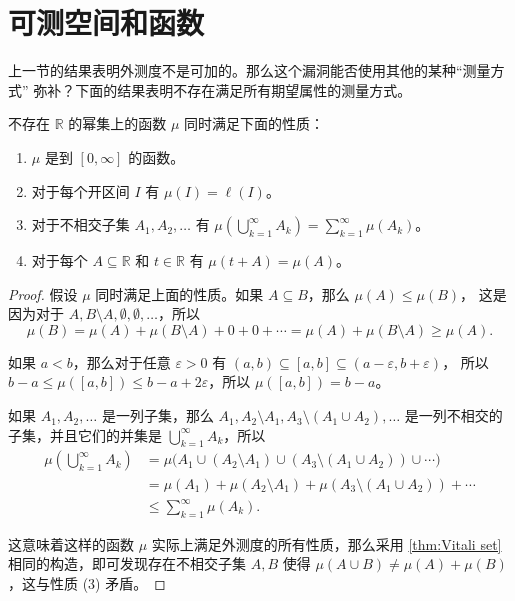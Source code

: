 \documentclass[fontset=none]{Notes}
\begin{document}
\section{可测空间和函数}

上一节的结果表明外测度不是可加的。那么这个漏洞能否使用其他的某种“测量方式”
弥补？下面的结果表明不存在满足所有期望属性的测量方式。

\begin{theorem}\label{thm:noexistence of size}
  不存在 $\mathbb{R}$ 的幂集上的函数 $\mu$ 同时满足下面的性质：
  \begin{enumerate}
    \item $\mu$ 是到 $[0,\infty]$ 的函数。
    \item 对于每个开区间 $I$ 有 $\mu(I)=\ell(I)$。
    \item 对于不相交子集 $A_1,A_2,\dots$ 有 $\mu\left(\bigcup_{k=1}^\infty A_k\right)=\sum_{k=1}^\infty\mu(A_k)$。
    \item 对于每个 $A\subseteq \mathbb{R}$ 和 $t\in \mathbb{R}$ 有 $\mu(t+A)=\mu(A)$。
  \end{enumerate}
\end{theorem}
\begin{proof}
  假设 $\mu$ 同时满足上面的性质。如果 $A\subseteq B$，那么 $\mu(A)\leq\mu(B)$，
  这是因为对于 $A,B\setminus A,\emptyset,\emptyset,\dots$，所以 
  \[
    \mu(B)=\mu(A)+\mu(B\setminus A)+0+0+\cdots=\mu(A)+\mu(B\setminus A)\geq \mu(A).
  \]

  如果 $a<b$，那么对于任意 $\varepsilon>0$ 有 $(a,b)\subseteq [a,b]\subseteq (a-\varepsilon,b+\varepsilon)$，
  所以 $b-a\leq \mu([a,b])\leq b-a+2\varepsilon$，所以 $\mu([a,b])=b-a$。

  如果 $A_1,A_2,\dots$ 是一列子集，那么 $A_1,A_2\setminus A_1,A_3\setminus (A_1\cup A_2),\dots$
  是一列不相交的子集，并且它们的并集是 $\bigcup_{k=1}^\infty A_k$，所以
  \begin{align*}
    \mu\left(\bigcup_{k=1}^\infty A_k\right)&=\mu\bigl(A_1\cup(A_2\setminus A_1)\cup(A_3\setminus(A_1\cup A_2))\cup\cdots\bigr)\\
    &=\mu(A_1)+\mu(A_2\setminus A_1)+\mu(A_3\setminus (A_1\cup A_2))+\cdots \\
    &\leq\sum_{k=1}^\infty\mu(A_k).
  \end{align*}

  这意味着这样的函数 $\mu$ 实际上满足外测度的所有性质，那么采用
  \autoref{thm:Vitali set} 相同的构造，即可发现存在不相交子集 $A,B$
  使得 $\mu(A\cup B)\neq\mu(A)+\mu(B)$，这与性质 (3) 矛盾。
\end{proof}
\end{document}
